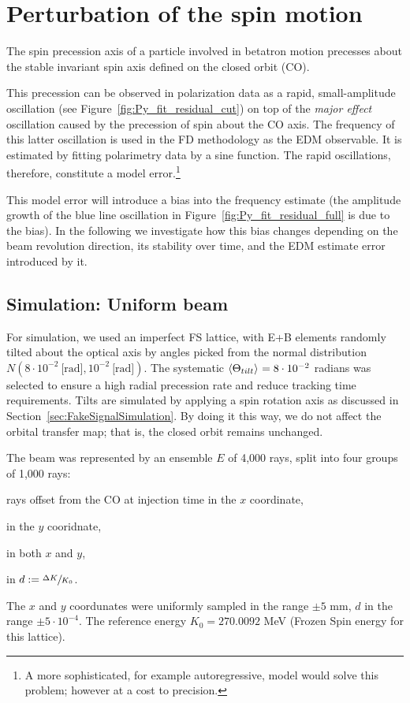 \documentclass{article}
\begin{document}
\section{Perturbation of the spin motion}
The spin precession axis of a particle involved in betatron motion precesses about the stable invariant spin axis defined on the closed orbit (CO).

This precession can be observed in polarization data as a rapid, small-amplitude oscillation (see Figure~\ref{fig:Py_fit_residual_cut}) on top of the \emph{major effect} oscillation caused by the precession of spin about the CO axis. The frequency of this latter oscillation is used in the FD methodology as the EDM observable. It is estimated by fitting polarimetry data by a sine function. The rapid oscillations, therefore, constitute a model error.\footnote{A more sophisticated, for example autoregressive, model would solve this problem; however at a cost to precision.}

This model error will introduce a bias into the frequency estimate (the amplitude growth of the blue line oscillation in Figure~\ref{fig:Py_fit_residual_full} is due to the bias). In the following we investigate how this bias changes depending on the beam revolution direction, its stability over time, and the EDM estimate error introduced by it.

\subsection{Simulation: Uniform beam}
For simulation, we used an imperfect FS lattice, with E+B elements randomly tilted about the optical axis by angles picked from the normal distribution $N(8\cdot 10^{-2}~\text{[rad]}, 10^{-2}~\text{[rad]})$. The systematic $\avg{\Theta_{tilt}} = 8\cdot 10^{-2}$ radians was selected to ensure a high radial precession rate and reduce tracking time requirements. Tilts are simulated by applying a spin rotation axis as discussed in Section~\ref{sec:FakeSignalSimulation}. By doing it this way, we do not affect the orbital transfer map; that is, the closed orbit remains unchanged.

The beam was represented by an ensemble $E$ of 4,000 rays, split into four groups of 1,000 rays:
\begin{inparaenum}[1)]
\item rays offset from the CO at injection time in the $x$ coordinate,
\item in the $y$ cooridnate,
\item in both $x$ and $y$,
\item in $d := \sfrac{\Delta K}{K_0}$.
\end{inparaenum}
The $x$ and $y$ coordunates were uniformly sampled in the range $\pm 5$ mm, $d$ in the range $\pm 5\cdot 10^{-4}$. The reference energy $K_0 = 270.0092$ MeV (Frozen Spin energy for this lattice).
\end{document}
